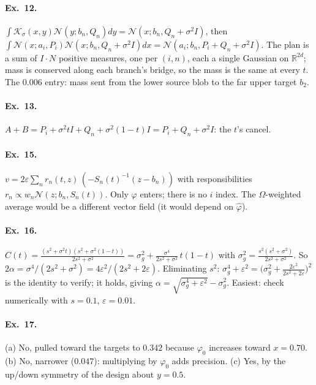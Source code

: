 \documentclass[11pt]{article}
\newcommand{\eps}{\varepsilon}
\newcommand{\R}{\mathbb{R}}
\newcommand{\Nc}{\mathcal{N}}
\newcommand{\Kc}{\mathcal{K}}
\newcommand{\hphi}{\hat\varphi}
\newcounter{ex}
\begin{document}
\paragraph{Ex.\ 12.} $\int\Kc_\sigma(x,y)\Nc(y;b_n,Q_n)dy=\Nc(x;b_n,Q_n+\sigma^2I)$, then
$\int\Nc(x;a_i,P_i)\Nc(x;b_n,Q_n+\sigma^2I)dx=\Nc(a_i;b_n,P_i+Q_n+\sigma^2I)$. The plan is a
sum of $I\!\cdot\!N$ positive measures, one per $(i,n)$, each a single Gaussian on $\R^{2d}$;
mass is conserved along each branch's bridge, so the mass is the same at every $t$.
The $0.006$ entry: mass sent from the lower source blob to the far upper target $b_2$.

\paragraph{Ex.\ 13.} $A+B=P_i+\sigma^2tI+Q_n+\sigma^2(1-t)I=P_i+Q_n+\sigma^2I$: the $t$'s cancel.

\paragraph{Ex.\ 15.} $v=2\eps\sum_n r_n(t,z)\,(-S_n(t)^{-1}(z-b_n))$ with responsibilities
$r_n\propto w_n\Nc(z;b_n,S_n(t))$. Only $\varphi$ enters; there is no $i$ index. The
$\Omega$-weighted average would be a different vector field (it would depend on $\hphi$).

\paragraph{Ex.\ 16.} $C(t)=\frac{(s^2+\sigma^2t)(s^2+\sigma^2(1-t))}{2s^2+\sigma^2}
=\sigma_g^2+\frac{\sigma^4}{2s^2+\sigma^2}\,t(1-t)$ with $\sigma_g^2=\frac{s^2(s^2+\sigma^2)}{2s^2+\sigma^2}$.
So $2\alpha=\sigma^4/(2s^2+\sigma^2)=4\eps^2/(2s^2+2\eps)$. Eliminating $s^2$:
$\sigma_g^4+\eps^2=\big(\sigma_g^2+\tfrac{2\eps^2}{2s^2+2\eps}\big)^2$ is the identity to verify;
it holds, giving $\alpha=\sqrt{\sigma_g^4+\eps^2}-\sigma_g^2$. Easiest: check numerically
with $s=0.1$, $\eps=0.01$.

\paragraph{Ex.\ 17.} (a) No, pulled toward the targets to $0.342$ because $\varphi_0$
increases toward $x=0.70$. (b) No, narrower ($0.047$): multiplying by $\varphi_0$ adds
precision. (c) Yes, by the up/down symmetry of the design about $y=0.5$.
\end{document}

